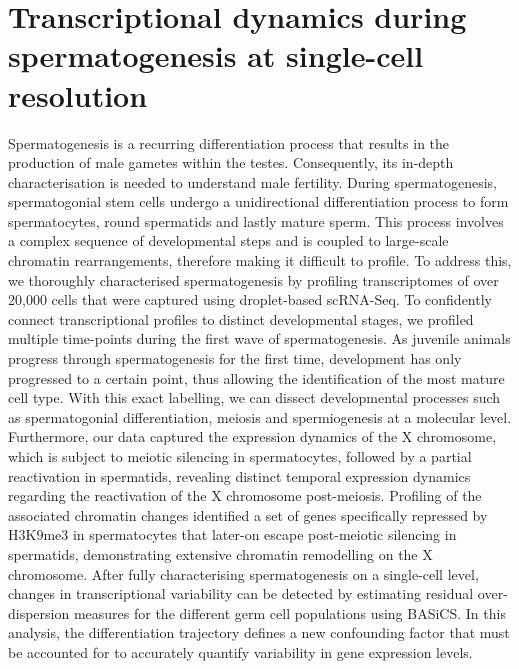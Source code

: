 
\chapter{Transcriptional dynamics during spermatogenesis at single-cell resolution}  

\graphicspath{{"../../Dropbox (Cambridge  University)/Figures_for_thesis/Chapter3/"}}

\begin{Abstract}
Spermatogenesis is a recurring differentiation process that results in the production of male gametes within the testes. Consequently, its in-depth characterisation is needed to understand male fertility. During spermatogenesis, spermatogonial stem cells undergo a unidirectional differentiation process to form spermatocytes, round spermatids and lastly mature sperm. This process involves a complex sequence of developmental steps and is coupled to large-scale chromatin rearrangements, therefore making it difficult to profile.
To address this, we thoroughly characterised spermatogenesis by   profiling transcriptomes of over 20,000 cells that were captured using droplet-based scRNA-Seq. To confidently connect transcriptional profiles to distinct developmental stages, we profiled multiple time-points during the first wave of spermatogenesis. As juvenile animals progress through spermatogenesis for the first time, development has only progressed to a certain point, thus allowing the identification of the most mature cell type. With this exact labelling, we can dissect developmental processes such as spermatogonial differentiation, meiosis and spermiogenesis at a molecular level. Furthermore, our data captured the expression dynamics of the X chromosome, which is subject to meiotic silencing in spermatocytes, followed by a partial reactivation in spermatids, revealing distinct temporal expression dynamics regarding the reactivation of the X chromosome post-meiosis. Profiling of the associated chromatin changes identified a set of genes specifically repressed by H3K9me3 in spermatocytes that later-on escape post-meiotic silencing in spermatids, demonstrating extensive chromatin remodelling on the X chromosome. After fully characterising spermatogenesis on a single-cell level, changes in transcriptional variability can be detected by estimating residual over-dispersion measures for the different germ cell populations using BASiCS. In this analysis, the differentiation trajectory defines a new confounding factor that must be accounted for to accurately quantify variability in gene expression levels.  
\end{Abstract}

